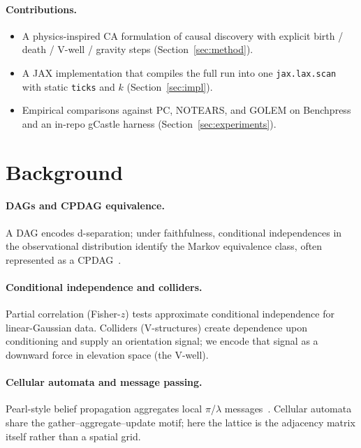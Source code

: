 \documentclass{article}
\begin{document}
\paragraph{Contributions.}
\begin{itemize}
  \item A physics-inspired CA formulation of causal discovery with explicit
        birth / death / V-well / gravity steps
        (Section~\ref{sec:method}).
  \item A JAX implementation that compiles the full run into one
        \texttt{jax.lax.scan} with static \texttt{ticks} and \(k\)
        (Section~\ref{sec:impl}).
  \item Empirical comparisons against PC, NOTEARS, and GOLEM on Benchpress
        and an in-repo gCastle harness (Section~\ref{sec:experiments}).
\end{itemize}

\section{Background}
\label{sec:background}


\paragraph{DAGs and CPDAG equivalence.}
A DAG encodes d-separation; under faithfulness, conditional independences in
the observational distribution identify the Markov equivalence class, often
represented as a CPDAG~\citep{spirtes2000}.

\paragraph{Conditional independence and colliders.}
Partial correlation (Fisher-\(z\)) tests approximate conditional independence
for linear-Gaussian data.
Colliders (V-structures) create dependence upon conditioning and supply an
orientation signal; we encode that signal as a downward force in elevation
space (the V-well).

\paragraph{Cellular automata and message passing.}
Pearl-style belief propagation aggregates local \(\pi\)/\(\lambda\)
messages~\citep{pearl1988}.
Cellular automata share the gather--aggregate--update motif; here the lattice
is the adjacency matrix itself rather than a spatial grid.
\end{document}
